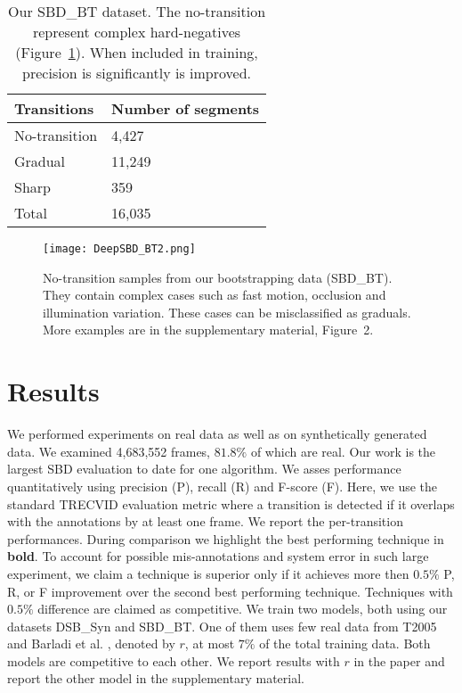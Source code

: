 \documentclass[journal]{IEEEtran}
\begin{document}
\begin{table}
\small
\centering
\begin{tabular}{| l | l | }
     \hline      
			Transitions									    &   Number of segments    \\
     \hline
				 No-transition              & 4,427 \\
			   Gradual              & 11,249 \\
				 Sharp            & 359 \\
			\hline
			Total               & 16,035 \\ 
			\hline
    \end{tabular}\vspace{3pt}
\caption{Our SBD\_BT dataset. The no-transition represent complex hard-negatives (Figure~\ref{fig:BTData}). When included in training, precision is significantly is improved.}
\label{tab:DeepSBDBT}
\end{table}

\begin{figure}
  \centering
   \texttt{[image: DeepSBD\_BT2.png]}
   \caption{No-transition samples from our bootstrapping data (SBD\_BT). They contain complex cases such as fast motion, occlusion and illumination variation. These cases can be misclassified as graduals. More examples are in the supplementary material, Figure~2.}
\label{fig:BTData}
 \end{figure}


\section{Results}

We performed experiments on real data as well as on synthetically generated data. We examined 4,683,552 frames, $81.8\%$ of which are real. Our work is the largest SBD evaluation to date for one algorithm. We asses performance quantitatively using precision (P), recall (R) and F-score (F). Here, we use the standard TRECVID evaluation metric \cite{Smeaton10} where a transition is detected if it overlaps with the annotations by at least one frame. We report the per-transition performances. During comparison we highlight the best performing technique in \textbf{bold}. To account for possible mis-annotations and system error in such large experiment, we claim a technique is superior only if it achieves more then $0.5\%$ P, R, or F improvement over the second best performing technique. Techniques with $0.5\%$ difference are claimed as competitive. We train two models, both using our datasets DSB\_Syn and SBD\_BT. One of them uses few real data from T2005 and Barladi et al. , denoted by \textbf{$r$}, at most $7\%$ of the total training data. Both models are competitive to each other. We report results with \textbf{$r$} in the paper and report the other model in the supplementary material. 
\end{document}
